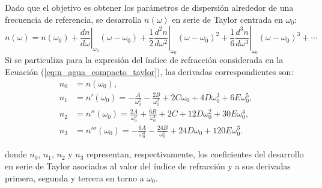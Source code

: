 Dado que el objetivo es obtener los parámetros de dispersión alrededor de una frecuencia de referencia, se desarrolla $n(\omega)$ en serie de Taylor centrada en $\omega_0$:
\begin{equation}
n(\omega)=n(\omega_{0})+\left.\frac{dn}{d\omega}\right|_{\omega_{0}}(\omega-\omega_{0})
+\frac{1}{2}\left.\frac{d^{2}n}{d\omega^{2}}\right|_{\omega_{0}}(\omega-\omega_{0})^{2}
+\frac{1}{6}\left.\frac{d^{3}n}{d\omega^{3}}\right|_{\omega_{0}}(\omega-\omega_{0})^{3}+ \cdots
\label{eq:taylor_n_agua}
\end{equation}
Si se particuliza para la expresión del índice de refracción considerada en la Ecuación (\ref{eq:n_agua_compacto_taylor}), las derivadas correspondientes son:
\begin{equation}\label{eq:n_derivs_agua}
\begin{aligned}
n_0 &= n(\omega_0),\\[4pt]
n_1 &= n'(\omega_0)
= -\frac{A}{\omega_0^2}
- \frac{2B}{\omega_0^3}
+ 2C \omega_0
+ 4D \omega_0^3
+ 6E \omega_0^5,\\[6pt]
n_2 &= n''(\omega_0)
= \frac{2A}{\omega_0^3}
+ \frac{6B}{\omega_0^4}
+ 2C
+ 12D\omega_0^2
+ 30E\omega_0^4,\\[6pt]
n_3 &= n'''(\omega_0)
= -\frac{6A}{\omega_0^4}
- \frac{24B}{\omega_0^5}
+ 24D\omega_0
+ 120E\omega_0^3.
\end{aligned}
\end{equation}

donde $n_0$, $n_1$, $n_2$ y $n_3$ representan, respectivamente, los coeficientes del desarrollo
en serie de Taylor asociados al valor del índice de refracción y a sus derivadas
primera, segunda y tercera en torno a $\omega_0$. 

